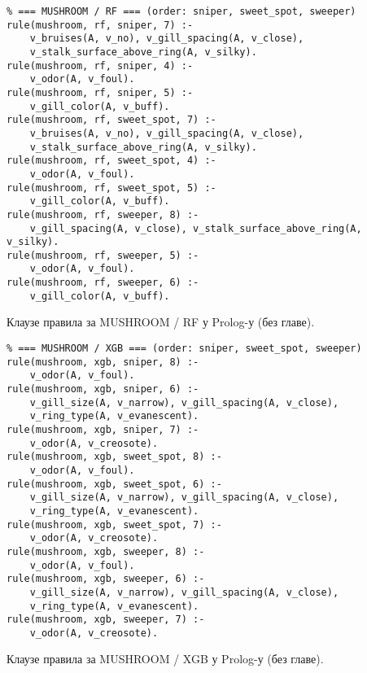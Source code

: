 \begin{appendices}
\begin{listing}[H]
\begin{verbatim}
% === MUSHROOM / RF === (order: sniper, sweet_spot, sweeper)
rule(mushroom, rf, sniper, 7) :-
    v_bruises(A, v_no), v_gill_spacing(A, v_close),
    v_stalk_surface_above_ring(A, v_silky).
rule(mushroom, rf, sniper, 4) :-
    v_odor(A, v_foul).
rule(mushroom, rf, sniper, 5) :-
    v_gill_color(A, v_buff).
rule(mushroom, rf, sweet_spot, 7) :-
    v_bruises(A, v_no), v_gill_spacing(A, v_close),
    v_stalk_surface_above_ring(A, v_silky).
rule(mushroom, rf, sweet_spot, 4) :-
    v_odor(A, v_foul).
rule(mushroom, rf, sweet_spot, 5) :-
    v_gill_color(A, v_buff).
rule(mushroom, rf, sweeper, 8) :-
    v_gill_spacing(A, v_close), v_stalk_surface_above_ring(A, v_silky).
rule(mushroom, rf, sweeper, 5) :-
    v_odor(A, v_foul).
rule(mushroom, rf, sweeper, 6) :-
    v_gill_color(A, v_buff).
\end{verbatim}
\caption{Клаузе правила за MUSHROOM / RF у Prolog-у (без главе).}
\label{code:prologbk-mushroom-rf}
\end{listing}

\begin{listing}[H]
\begin{verbatim}
% === MUSHROOM / XGB === (order: sniper, sweet_spot, sweeper)
rule(mushroom, xgb, sniper, 8) :-
    v_odor(A, v_foul).
rule(mushroom, xgb, sniper, 6) :-
    v_gill_size(A, v_narrow), v_gill_spacing(A, v_close),
    v_ring_type(A, v_evanescent).
rule(mushroom, xgb, sniper, 7) :-
    v_odor(A, v_creosote).
rule(mushroom, xgb, sweet_spot, 8) :-
    v_odor(A, v_foul).
rule(mushroom, xgb, sweet_spot, 6) :-
    v_gill_size(A, v_narrow), v_gill_spacing(A, v_close),
    v_ring_type(A, v_evanescent).
rule(mushroom, xgb, sweet_spot, 7) :-
    v_odor(A, v_creosote).
rule(mushroom, xgb, sweeper, 8) :-
    v_odor(A, v_foul).
rule(mushroom, xgb, sweeper, 6) :-
    v_gill_size(A, v_narrow), v_gill_spacing(A, v_close),
    v_ring_type(A, v_evanescent).
rule(mushroom, xgb, sweeper, 7) :-
    v_odor(A, v_creosote).
\end{verbatim}
\caption{Клаузе правила за MUSHROOM / XGB у Prolog-у (без главе).}
\label{code:prologbk-mushroom-xgb}
\end{listing}


\end{appendices}
